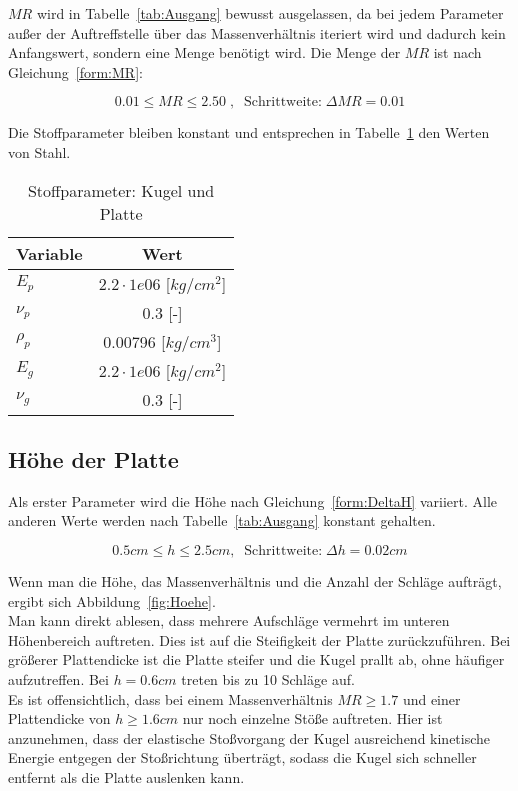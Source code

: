$MR$ wird in Tabelle~\ref{tab:Ausgang} bewusst ausgelassen, da bei jedem Parameter außer der Auftreffstelle über das Massenverhältnis iteriert wird und dadurch kein Anfangswert, sondern eine Menge benötigt wird. Die Menge der $MR$ ist nach Gleichung~\ref{form:MR}:

\begin{equation}
	\label{form:MR}
	0.01 \leq MR \leq 2.50 \; , \;\; \mbox{Schrittweite:} \; \Delta MR = 0.01
\end{equation}

Die Stoffparameter bleiben konstant und entsprechen in Tabelle~\ref{tab:Stoff} den Werten von Stahl.

\begin{table}[H]
	\begin{center}
		\caption{Stoffparameter: Kugel und Platte}
		\label{tab:Stoff}
		\begin{tabular}{l|c}
			\textbf{Variable} & \textbf{Wert}\\
			\hline
			$E_{p}$ & $2.2 \cdot 1e06$ [$kg/cm^2$]\\
			$\nu_{p}$ & 0.3 [-]\\
			$\rho_{p}$ & 0.00796 [$kg/cm^{3}$]\\
			\hline
			$E_{g}$ &  $2.2 \cdot 1e06$ [$kg/cm^2$]\\
			$\nu_{g}$ & 0.3 [-]\\		
		\end{tabular}
	\end{center}
\end{table}

\subsection{Höhe der Platte}

Als erster Parameter wird die Höhe nach Gleichung~\ref{form:DeltaH} variiert. Alle anderen Werte werden nach Tabelle~\ref{tab:Ausgang} konstant gehalten.

\begin{equation}
	\label{form:DeltaH}
	0.5 cm \leq h \leq 2.5 cm, \; \; \mbox{Schrittweite:} \; \Delta h = 0.02 cm
\end{equation}

Wenn man die Höhe, das Massenverhältnis und die Anzahl der Schläge aufträgt, ergibt sich Abbildung~\ref{fig:Hoehe}.\\
Man kann direkt ablesen, dass mehrere Aufschläge vermehrt im unteren Höhenbereich auftreten. Dies ist auf die Steifigkeit der Platte zurückzuführen. Bei größerer Plattendicke ist die Platte steifer und die Kugel prallt ab, ohne häufiger aufzutreffen. Bei $h = 0.6 cm$ treten bis zu 10 Schläge auf.\\
Es ist offensichtlich, dass bei einem Massenverhältnis $MR \geq 1.7$ und einer Plattendicke von $h \geq 1.6 cm$ nur noch einzelne Stöße auftreten. Hier ist anzunehmen, dass der elastische Stoßvorgang der Kugel ausreichend kinetische Energie entgegen der Stoßrichtung überträgt, sodass die Kugel sich schneller entfernt als die Platte auslenken kann. \\

